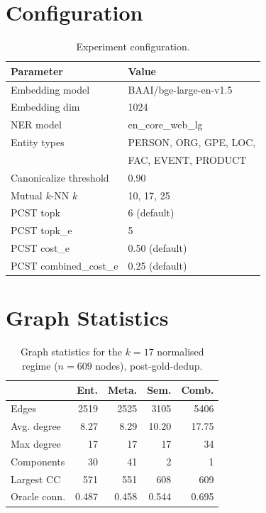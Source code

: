 \documentclass[11pt]{article}
\begin{document}
\clearpage
\appendix

\section{Configuration}
\label{sec:config}

\begin{table}[htbp]
  \centering
  \small
  \begin{tabular}{ll}
    \toprule
    \textbf{Parameter} & \textbf{Value} \\
    \midrule
    Embedding model & BAAI/bge-large-en-v1.5 \\
    Embedding dim   & 1024 \\
    NER model       & en\_core\_web\_lg \\
    Entity types    & PERSON, ORG, GPE, LOC, \\
                    & FAC, EVENT, PRODUCT \\
    Canonicalize threshold & 0.90 \\
    Mutual $k$-NN $k$ & 10, 17, 25 \\
    PCST topk       & 6 (default) \\
    PCST topk\_e    & 5 \\
    PCST cost\_e    & 0.50 (default) \\
    PCST combined\_cost\_e & 0.25 (default) \\
    \bottomrule
  \end{tabular}
  \caption{Experiment configuration.}
  \label{tab:config}
\end{table}

\section{Graph Statistics}
\label{sec:graph-stats}

\begin{table}[htbp]
  \centering
  \small
  \begin{tabular}{lrrrr}
    \toprule
    & \textbf{Ent.} & \textbf{Meta.} & \textbf{Sem.} & \textbf{Comb.} \\
    \midrule
    Edges        & 2519 & 2525 & 3105 & 5406 \\
    Avg. degree  & 8.27 & 8.29 & 10.20 & 17.75 \\
    Max degree   & 17   & 17   & 17   & 34    \\
    Components   & 30   & 41   & 2    & 1     \\
    Largest CC   & 571  & 551  & 608  & 609   \\
    Oracle conn. & 0.487 & 0.458 & 0.544 & 0.695 \\
    \bottomrule
  \end{tabular}
  \caption{Graph statistics for the $k{=}17$ normalised regime ($n{=}609$ nodes), post-gold-dedup.}
  \label{tab:graph-stats}
\end{table}
\end{document}
